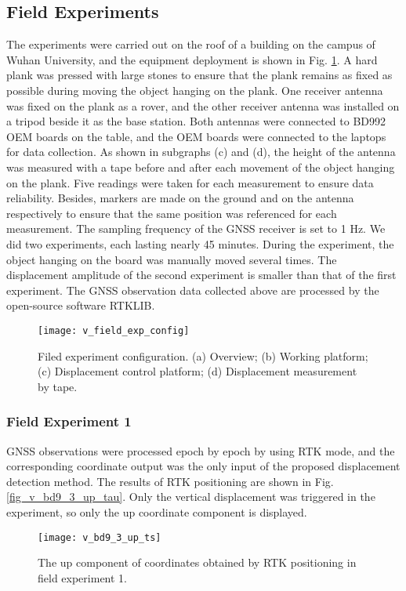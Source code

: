 \documentclass[journal]{IEEEtran}
\begin{document}
\subsection{Field Experiments}
The experiments were carried out on the roof of a building on the campus of Wuhan University, and the equipment deployment is shown in Fig. \ref{fig_v_field_exp_config}. 
A hard plank was pressed with large stones to ensure that the plank remains as fixed as possible during moving the object hanging on the plank. 
One receiver antenna was fixed on the plank as a rover, and the other receiver antenna was installed on a tripod beside it as the base station. 
Both antennas were connected to BD992 OEM boards on the table, and the OEM boards were connected to the laptops for data collection. 
As shown in subgraphs (c) and (d), the height of the antenna was measured with a tape before and after each movement of the object hanging on the plank. 
Five readings were taken for each measurement to ensure data reliability.
Besides, markers are made on the ground and on the antenna respectively to ensure that the same position was referenced for each measurement. 
The sampling frequency of the GNSS receiver is set to 1 Hz. 
We did two experiments, each lasting nearly 45 minutes. 
During the experiment, the object hanging on the board was manually moved several times.
The displacement amplitude of the second experiment is smaller than that of the first experiment.
The GNSS observation data collected above are processed by the open-source software RTKLIB\cite{takasu2011rtklib}. 
\begin{figure}[htbp]
	\centering
	\texttt{[image: v\_field\_exp\_config]}
	\caption{Filed experiment configuration. (a) Overview; (b) Working platform; (c) Displacement control platform; (d) Displacement measurement by tape. }
	\label{fig_v_field_exp_config}
\end{figure} 

\subsubsection{Field Experiment 1}
GNSS observations were processed epoch by epoch by using RTK mode, and the corresponding coordinate output was the only input of the proposed displacement detection method.
The results of RTK positioning are shown in Fig. \ref{fig_v_bd9_3_up_tau}.
Only the vertical displacement was triggered in the experiment, so only the up coordinate component is displayed. 
\begin{figure}[htbp]
	\centering
	\texttt{[image: v\_bd9\_3\_up\_ts]}
	\caption{The up component of coordinates obtained by RTK positioning in field experiment 1.}
	\label{fig_v_bd9_3_up_ts}
\end{figure} 
\end{document}
